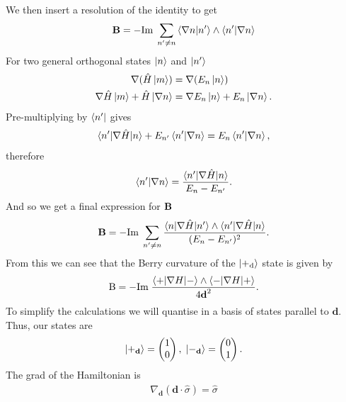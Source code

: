 We then insert a resolution of the identity to get
\begin{align}
    \textbf{B} = -\textup{Im}\;\sum_{n'\neq n}\braket{\nabla n|n'}\wedge\braket{n'|\nabla n}
\end{align}
For two general orthogonal states $\ket{n}$ and $\ket{n'}$
\begin{align}
    \nabla (\hat H \ket{m}) &= \nabla (E_n \ket{n})\\
    \nabla \hat H \ket{m}+\hat  H\ket{\nabla n} &= \nabla E_n \ket{n}+ E_n\ket{\nabla n} .
\end{align}
Pre-multiplying by $\bra{n'}$ gives
\begin{align}
\braket{n'|\nabla\hat  H|n} + E_{n'}\braket{n'|\nabla n} = E_n\braket{n' | \nabla n},
\end{align}
therefore
\begin{align}
    \braket{n'|\nabla n} = \frac{\braket{n'|\nabla\hat  H|n}}{E_n - E_{n'}}.
\end{align}
And so we get a final expression for $\bf B$
\begin{align}\label{berry_formula}
\textbf{B} = -\textup{Im}\;\sum_{n'\neq n} \frac{\braket{n|\nabla\hat  H|n'} \wedge \braket{n'|\nabla\hat  H|n}}{(E_n - E_{n'})^2}.
\end{align}
From this we can see that the Berry curvature of the $\ket{+_\textup{d}}$ state is given by
\begin{align}
    \textup{B} = -\textup{Im}\; \frac{\braket{+|\nabla H|-} \wedge \braket{-|\nabla H|+}}{4\textbf{d}^2}.
\end{align}
To simplify the calculations we will quantise in a basis of states parallel to $\textbf{d}$. Thus, our states are
\begin{align}
    \ket{+_{\textbf{d}}} = \begin{pmatrix}
1\\ 
0
\end{pmatrix},\; \ket{-_{\textbf{d}}} = \begin{pmatrix}
0\\ 
1
\end{pmatrix}.
\end{align}
The grad of the Hamiltonian is
\begin{align}
    \nabla_\textbf{d} (\textbf{d} \cdot \hat{\sigma} )= \hat{\sigma}
\end{align}

